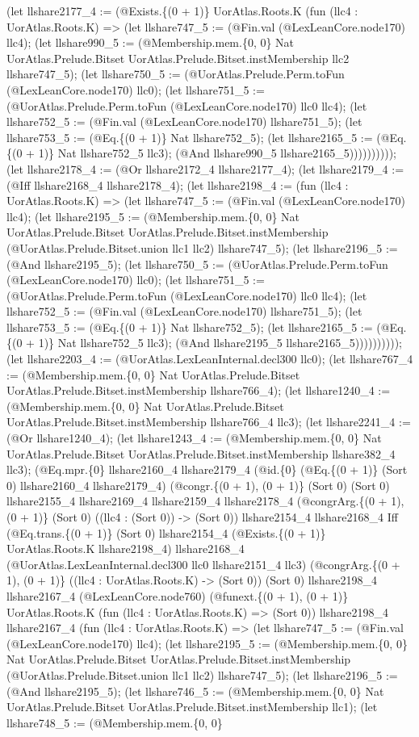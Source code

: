 \documentclass[11pt]{article}
\begin{document}
(let llshare2177\_4 := (@Exists.\{(0 + 1)\} UorAtlas.Roots.K (fun (llc4 : UorAtlas.Roots.K) => (let llshare747\_5 := (@Fin.val (@LexLeanCore.node170) llc4); (let llshare990\_5 := (@Membership.mem.\{0, 0\} Nat UorAtlas.Prelude.Bitset UorAtlas.Prelude.Bitset.instMembership llc2 llshare747\_5); (let llshare750\_5 := (@UorAtlas.Prelude.Perm.toFun (@LexLeanCore.node170) llc0); (let llshare751\_5 := (@UorAtlas.Prelude.Perm.toFun (@LexLeanCore.node170) llc0 llc4); (let llshare752\_5 := (@Fin.val (@LexLeanCore.node170) llshare751\_5); (let llshare753\_5 := (@Eq.\{(0 + 1)\} Nat llshare752\_5); (let llshare2165\_5 := (@Eq.\{(0 + 1)\} Nat llshare752\_5 llc3); (@And llshare990\_5 llshare2165\_5)))))))))); (let llshare2178\_4 := (@Or llshare2172\_4 llshare2177\_4); (let llshare2179\_4 := (@Iff llshare2168\_4 llshare2178\_4); (let llshare2198\_4 := (fun (llc4 : UorAtlas.Roots.K) => (let llshare747\_5 := (@Fin.val (@LexLeanCore.node170) llc4); (let llshare2195\_5 := (@Membership.mem.\{0, 0\} Nat UorAtlas.Prelude.Bitset UorAtlas.Prelude.Bitset.instMembership (@UorAtlas.Prelude.Bitset.union llc1 llc2) llshare747\_5); (let llshare2196\_5 := (@And llshare2195\_5); (let llshare750\_5 := (@UorAtlas.Prelude.Perm.toFun (@LexLeanCore.node170) llc0); (let llshare751\_5 := (@UorAtlas.Prelude.Perm.toFun (@LexLeanCore.node170) llc0 llc4); (let llshare752\_5 := (@Fin.val (@LexLeanCore.node170) llshare751\_5); (let llshare753\_5 := (@Eq.\{(0 + 1)\} Nat llshare752\_5); (let llshare2165\_5 := (@Eq.\{(0 + 1)\} Nat llshare752\_5 llc3); (@And llshare2195\_5 llshare2165\_5)))))))))); (let llshare2203\_4 := (@UorAtlas.LexLeanInternal.decl300 llc0); (let llshare767\_4 := (@Membership.mem.\{0, 0\} Nat UorAtlas.Prelude.Bitset UorAtlas.Prelude.Bitset.instMembership llshare766\_4); (let llshare1240\_4 := (@Membership.mem.\{0, 0\} Nat UorAtlas.Prelude.Bitset UorAtlas.Prelude.Bitset.instMembership llshare766\_4 llc3); (let llshare2241\_4 := (@Or llshare1240\_4); (let llshare1243\_4 := (@Membership.mem.\{0, 0\} Nat UorAtlas.Prelude.Bitset UorAtlas.Prelude.Bitset.instMembership llshare382\_4 llc3); (@Eq.mpr.\{0\} llshare2160\_4 llshare2179\_4 (@id.\{0\} (@Eq.\{(0 + 1)\} (Sort 0) llshare2160\_4 llshare2179\_4) (@congr.\{(0 + 1), (0 + 1)\} (Sort 0) (Sort 0) llshare2155\_4 llshare2169\_4 llshare2159\_4 llshare2178\_4 (@congrArg.\{(0 + 1), (0 + 1)\} (Sort 0) ((llc4 : (Sort 0)) -> (Sort 0)) llshare2154\_4 llshare2168\_4 Iff (@Eq.trans.\{(0 + 1)\} (Sort 0) llshare2154\_4 (@Exists.\{(0 + 1)\} UorAtlas.Roots.K llshare2198\_4) llshare2168\_4 (@UorAtlas.LexLeanInternal.decl300 llc0 llshare2151\_4 llc3) (@congrArg.\{(0 + 1), (0 + 1)\} ((llc4 : UorAtlas.Roots.K) -> (Sort 0)) (Sort 0) llshare2198\_4 llshare2167\_4 (@LexLeanCore.node760) (@funext.\{(0 + 1), (0 + 1)\} UorAtlas.Roots.K (fun (llc4 : UorAtlas.Roots.K) => (Sort 0)) llshare2198\_4 llshare2167\_4 (fun (llc4 : UorAtlas.Roots.K) => (let llshare747\_5 := (@Fin.val (@LexLeanCore.node170) llc4); (let llshare2195\_5 := (@Membership.mem.\{0, 0\} Nat UorAtlas.Prelude.Bitset UorAtlas.Prelude.Bitset.instMembership (@UorAtlas.Prelude.Bitset.union llc1 llc2) llshare747\_5); (let llshare2196\_5 := (@And llshare2195\_5); (let llshare746\_5 := (@Membership.mem.\{0, 0\} Nat UorAtlas.Prelude.Bitset UorAtlas.Prelude.Bitset.instMembership llc1); (let llshare748\_5 := (@Membership.mem.\{0, 0\} 
\end{document}
